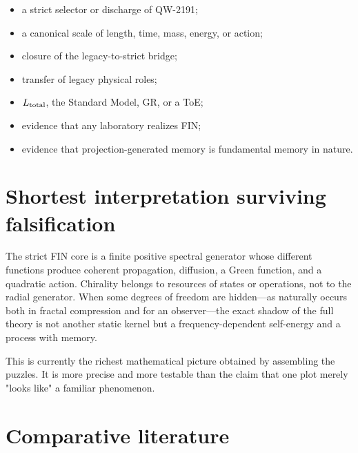 \documentclass[11pt,a4paper,openany]{report}
\begin{document}
\begin{itemize}
\item 
a strict selector or discharge of QW-2191;

\item 
a canonical scale of length, time, mass, energy, or action;

\item 
closure of the legacy-to-strict bridge;

\item 
transfer of legacy physical roles;

\item 
\(L_{\rm total}\), the Standard Model, GR, or a ToE;

\item 
evidence that any laboratory realizes FIN;

\item 
evidence that projection-generated memory is fundamental memory in nature.

\end{itemize}

\chapter{Shortest interpretation surviving falsification}

The strict FIN core is a finite positive spectral generator whose different functions produce coherent propagation, diffusion, a Green function, and a quadratic action. Chirality belongs to resources of states or operations, not to the radial generator. When some degrees of freedom are hidden---as naturally occurs both in fractal compression and for an observer---the exact shadow of the full theory is not another static kernel but a frequency-dependent self-energy and a process with memory.

This is currently the richest mathematical picture obtained by assembling the puzzles. It is more precise and more testable than the claim that one plot merely "looks like" a familiar phenomenon.

\chapter{Comparative literature}
\end{document}
